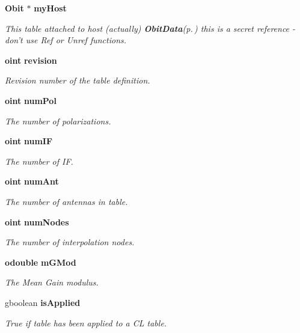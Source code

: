 \begin{CompactItemize}
{\bf Obit} $\ast$ {\bf my\-Host}
\begin{CompactList}\small\item\em This table attached to host (actually) {\bf Obit\-Data}{\rm (p.\,\pageref{structObitData})} this is a secret reference - don't use Ref or Unref functions. \item\end{CompactList}\item 
{\bf oint} {\bf revision}
\begin{CompactList}\small\item\em Revision number of the table definition. \item\end{CompactList}\item 
{\bf oint} {\bf num\-Pol}
\begin{CompactList}\small\item\em The number of polarizations. \item\end{CompactList}\item 
{\bf oint} {\bf num\-IF}
\begin{CompactList}\small\item\em The number of IF. \item\end{CompactList}\item 
{\bf oint} {\bf num\-Ant}
\begin{CompactList}\small\item\em The number of antennas in table. \item\end{CompactList}\item 
{\bf oint} {\bf num\-Nodes}
\begin{CompactList}\small\item\em The number of interpolation nodes. \item\end{CompactList}\item 
{\bf odouble} {\bf m\-GMod}
\begin{CompactList}\small\item\em The Mean Gain modulus. \item\end{CompactList}\item 
gboolean {\bf is\-Applied}
\begin{CompactList}\small\item\em True if table has been applied to a CL table. \item\end{CompactList}\item 

\end{CompactItemize}
